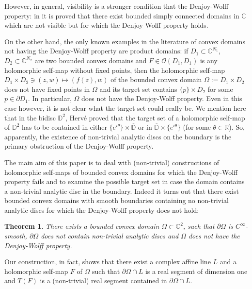 \documentclass[12pt]{amsart}
\newtheorem{theorem}{Theorem}[section]
\theoremstyle{definition}
\theoremstyle{remark}
\numberwithin{equation}{section}
\def\C{\mathbb C}
\def\D{\mathbb D}
\def\R{\mathbb R}
\begin{document}
However, in general, visibility is a stronger  condition that the Denjoy-Wolff property: in \cite[Corollary 1.6]{BB} it is proved that there exist  bounded simply connected  domains in $\C$  which are not visible but for which the Denjoy-Wolff property  holds. 

On the other hand, the only known examples in the literature of  convex domains not having the Denjoy-Wolff property are product domains:  if $D_1\subset \C^{N_1}$, $D_2\subset \C^{N_2}$ are two bounded convex domains and $F\in  \mathcal{O}(D_1,D_1)$ is any holomorphic self-map without fixed points, then the holomorphic self-map $D_1\times D_2\ni (z,w)\mapsto (f(z), w)$ of the bounded convex domain $\Omega:=D_1\times D_2$ does not have fixed points in $\Omega$ and its target set contains $\{p\}\times D_2$ for some $p\in \partial D_1$. In particular, $\Omega$ does not have the Denjoy-Wolff property. Even in this case however, it is not clear what the target set could really be. We mention here that in the bidisc $\D^2$,  Herv\'e \cite{Her} proved that the target set of a holomorphic self-map of $\D^2$ has to be contained in either $\{e^{i\theta}\}\times \overline{\mathbb D}$ or in $\overline{\mathbb D}\times \{e^{i\theta}\}$ (for some $\theta\in \R$). So, apparently, the existence of non-trivial analytic discs on the boundary is the primary obstruction of the Denjoy-Wolff property. 

The main aim of this paper is to deal with  (non-trivial) constructions of holomorphic self-maps of   bounded convex domains for which the Denjoy-Wolff property fails and to examine the possible target set in case the domain contains a non-trivial analytic disc in the boundary. Indeed it turns out that there exist bounded convex domains with smooth boundaries containing no non-trivial analytic discs for which the Denjoy-Wolff property does not hold:

\begin{theorem}\label{cor:existence-nonDW}
There exists a bounded convex domain  $\Omega\subset \C^2$,  such that $\partial \Omega$ is $C^\infty$-smooth,  $\partial \Omega$ does not contain  non-trivial analytic discs  and $\Omega$ does not have  the Denjoy-Wolff property. 
\end{theorem}

 {Our construction, in fact, shows that there exist a complex affine line $L$ and a holomorphic self-map $F$ of $\Omega$ such that $\partial \Omega\cap L$ is a real segment of dimension one and $T(F)$ is a (non-trivial) real segment contained in  $\partial \Omega\cap L$}. 
\end{document}
